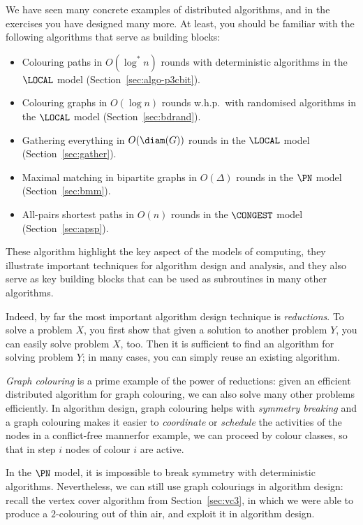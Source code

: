 We have seen many concrete examples of distributed algorithms, and in the exercises you have designed many more. At least, you should be familiar with the following algorithms that serve as building blocks:
\begin{itemize}
    \item Colouring paths in $O(\log^* n)$ rounds with deterministic algorithms in the $\LOCAL$ model (Section~\ref{sec:algo-p3cbit}).
    \item Colouring graphs in $O(\log n)$ rounds w.h.p.\ with randomised algorithms in the $\LOCAL$ model (Section~\ref{sec:bdrand}).
    \item Gathering everything in $O(\diam(G))$ rounds in the $\LOCAL$ model (Section~\ref{sec:gather}).
    \item Maximal matching in bipartite graphs in $O(\Delta)$ rounds in the $\PN$ model (Section~\ref{sec:bmm}).
    \item All-pairs shortest paths in $O(n)$ rounds in the $\CONGEST$ model (Section~\ref{sec:apsp}).
\end{itemize}
These algorithm highlight the key aspect of the models of computing, they illustrate important techniques for algorithm design and analysis, and they also serve as key building blocks that can be used as subroutines in many other algorithms.

Indeed, by far the most important algorithm design technique is \emph{reductions}. To solve a problem $X$, you first show that given a solution to another problem $Y$, you can easily solve problem $X$, too. Then it is sufficient to find an algorithm for solving problem $Y$; in many cases, you can simply reuse an existing algorithm.

\emph{Graph colouring} is a prime example of the power of reductions: given an efficient distributed algorithm for graph colouring, we can also solve many other problems efficiently. In algorithm design, graph colouring helps with \emph{symmetry breaking} and a graph colouring makes it easier to \emph{coordinate} or \emph{schedule} the activities of the nodes in a conflict-free manner\mydash for example, we can proceed by colour classes, so that in step $i$ nodes of colour $i$ are active.

In the $\PN$ model, it is impossible to break symmetry with deterministic algorithms. Nevertheless, we can still use graph colourings in algorithm design: recall the vertex cover algorithm from Section~\ref{sec:vc3}, in which we were able to produce a $2$-colouring out of thin air, and exploit it in algorithm design.


